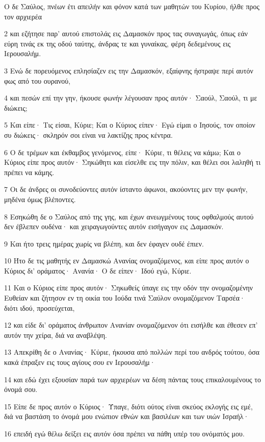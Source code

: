 \par Ο δε Σαύλος, πνέων έτι απειλήν και φόνον κατά των μαθητών του Κυρίου, ήλθε προς τον αρχιερέα
\par 2 και εζήτησε παρ' αυτού επιστολάς εις Δαμασκόν προς τας συναγωγάς, όπως εάν εύρη τινάς εκ της οδού ταύτης, άνδρας τε και γυναίκας, φέρη δεδεμένους εις Ιερουσαλήμ.
\par 3 Ενώ δε πορευόμενος επλησίαζεν εις την Δαμασκόν, εξαίφνης ήστραψε περί αυτόν φως από του ουρανού,
\par 4 και πεσών επί την γην, ήκουσε φωνήν λέγουσαν προς αυτόν· Σαούλ, Σαούλ, τι με διώκεις;
\par 5 Και είπε· Τις είσαι, Κύριε; Και ο Κύριος είπεν· Εγώ είμαι ο Ιησούς, τον οποίον συ διώκεις· σκληρόν σοι είναι να λακτίζης προς κέντρα.
\par 6 Ο δε τρέμων και έκθαμβος γενόμενος, είπε· Κύριε, τι θέλεις να κάμω; Και ο Κύριος είπε προς αυτόν· Σηκώθητι και είσελθε εις την πόλιν, και θέλει σοι λαληθή τι πρέπει να κάμης.
\par 7 Οι δε άνδρες οι συνοδεύοντες αυτόν ίσταντο άφωνοι, ακούοντες μεν την φωνήν, μηδένα όμως βλέποντες.
\par 8 Εσηκώθη δε ο Σαύλος από της γης, και έχων ανεωγμένους τους οφθαλμούς αυτού δεν έβλεπεν ουδένα· και χειραγωγούντες αυτόν εισήγαγον εις Δαμασκόν.
\par 9 Και ήτο τρεις ημέρας χωρίς να βλέπη, και δεν έφαγεν ουδέ έπιεν.
\par 10 Ήτο δε τις μαθητής εν Δαμασκώ Ανανίας ονομαζόμενος, και είπε προς αυτόν ο Κύριος δι' οράματος· Ανανία· Ο δε είπεν· Ιδού εγώ, Κύριε.
\par 11 Και ο Κύριος είπε προς αυτόν· Σηκωθείς ύπαγε εις την οδόν την ονομαζομένην Ευθείαν και ζήτησον εν τη οικία του Ιούδα τινά Σαύλον ονομαζόμενον Ταρσέα· διότι ιδού, προσεύχεται,
\par 12 και είδε δι' οράματος άνθρωπον Ανανίαν ονομαζόμενον ότι εισήλθε και έθεσεν επ' αυτόν την χείρα, διά να αναβλέψη.
\par 13 Απεκρίθη δε ο Ανανίας· Κύριε, ήκουσα από πολλών περί του ανδρός τούτου, όσα κακά έπραξεν εις τους αγίους σου εν Ιερουσαλήμ·
\par 14 και εδώ έχει εξουσίαν παρά των αρχιερέων να δέση πάντας τους επικαλουμένους το όνομά σου.
\par 15 Είπε δε προς αυτόν ο Κύριος· Ύπαγε, διότι ούτος είναι σκεύος εκλογής εις εμέ, διά να βαστάση το όνομά μου ενώπιον εθνών και βασιλέων και των υιών Ισραήλ·
\par 16 επειδή εγώ θέλω δείξει εις αυτόν όσα πρέπει να πάθη υπέρ του ονόματός μου.
